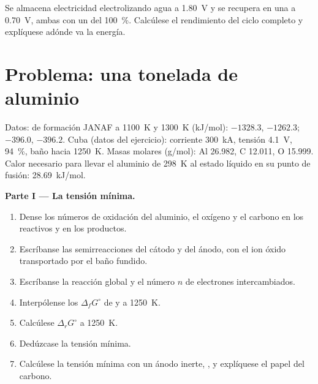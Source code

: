 \begin{exercise}[$\star\star\star$]\label{exo:b2:batteries-electrolysis:12}
Se almacena electricidad electrolizando agua a \qty{1.80}{V} y se recupera en una
 a \qty{0.70}{V}, ambas con un  del 100~\%. Calcúlese el
rendimiento del ciclo completo y explíquese adónde va la energía.
\end{exercise}

\section{Problema: una tonelada de aluminio}

\begin{problem}
\label{pb:b2:batteries-electrolysis:1}
Datos:  de formación JANAF a \qty{1100}{K} y \qty{1300}{K}
(\unit{kJ/mol}):  $-1328.3$, $-1262.3$;  $-396.0$, $-396.2$. Cuba
(datos del ejercicio): corriente \qty{300}{kA}, tensión \qty{4.1}{V}, 
94~\%, baño hacia \qty{1250}{K}. Masas molares (\unit{g/mol}): Al 26.982, C 12.011,
O 15.999. Calor necesario para llevar el aluminio de \qty{298}{K} al estado líquido en su punto de
fusión: \qty{28.69}{kJ/mol}.

\medskip
\noindent\textbf{Parte I --- La tensión mínima.}
\begin{enumerate}
  \item Dense los números de oxidación del aluminio, el oxígeno y el carbono en los
        reactivos y en los productos.
  \item Escríbanse las semirreacciones del cátodo y del ánodo, con el ion óxido
         transportado por el baño fundido.
  \item Escríbanse la reacción global y el número $n$ de electrones intercambiados.
  \item Interpólense los $\Delta_f G^\circ$ de  y  a \qty{1250}{K}.
  \item Calcúlese $\Delta_r G^\circ$ a \qty{1250}{K}.
  \item Dedúzcase la tensión mínima.
  \item Calcúlese la tensión mínima con un ánodo inerte,
        , y explíquese el papel del carbono.
\end{enumerate}


\end{problem}
